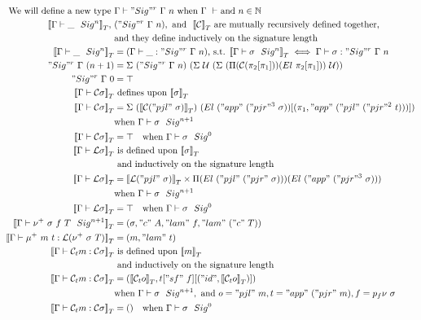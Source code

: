 \begin{align*}
  \text{We will define a new type }& \goodType{\Gamma}{\Sigr{\Gamma}{n}}{} \text{ when } \goodCtx{\Gamma}{} \text{ and } n \in \mathbb{N} \\
  \denotesT{\goodSig{\Gamma}{\_}{n}},\ &({\Sigr{\Gamma}{n}}), \text{ and } \ \denotesT{\cC} \text{ are mutually recursively defined together, } \\
  & \text{and they define inductively on the signature length} \\  
  \denotesT{\goodSig{\Gamma}{\_}{n}} &= (\goodTerm{\Gamma}{\_}{\Sigr{\Gamma}{n}}) \text{, s.t. } \denotesT{\goodSig{\Gamma}{\sigma}{n}} \iff \goodTerm{\Gamma}{\sigma}{\Sigr{\Gamma}{n}} \\ 
  {\Sigr{\Gamma}{(n+1)}} &= 
    \Sigma~(\Sigr{\Gamma}{n})
          ~(\Sigma~\cU
                  ~(\Sigma~(\Pi(\cC (\pi_2[\pi_1]))(El~\pi_2[\pi_1]))~\cU)) \\
  \Sigr{\Gamma}{0} &= \top \\
  \denotesT{\goodType{\Gamma}{\cC \sigma}{}} &\text{ defines upon } \denotesT{\sigma} \\
  \denotesT{\goodType{\Gamma}{\cC \sigma}{}} &= 
    \Sigma~(\denotesT{\cC ("pjl"~\sigma)})~(El \ ("app"~("pjr"^3~\sigma))[(\pi_1, "app"~("pjl"~("pjr"^2~t)))]) \\
      &\text{when } \goodSig{\Gamma}{\sigma}{n+1} \\
  \denotesT{\goodType{\Gamma}{\cC \sigma}{}} &= \top \quad
      \text{when } \goodSig{\Gamma}{\sigma}{0} \\ 
  \denotesT{\goodType{\Gamma}{\cL\sigma}{}} & \text{ is defined upon } \denotesT{\sigma} \\
  & \text{ and inductively on the signature length} \\ 
  \denotesT{\goodType{\Gamma}{\cL\sigma}{}} &=
  \denotesT{\cL("pjl"~\sigma)} \times \Pi(El~("pjl"~("pjr"~\sigma)))(El~("app"~("pjr"^3~\sigma))) \\
  &\text{when } \goodSig{\Gamma}{\sigma}{n+1} \\
  \denotesT{\goodType{\Gamma}{\cL\sigma}{}} &= \top \quad \text{when } \goodSig{\Gamma}{\sigma}{0} \\
  \denotesT{\goodSig{\Gamma}{\nu^+~\sigma~f~T}{n+1}} &= (\sigma, "c"~A, "lam"~f, "lam"~("c"~T)) \\ 
  \denotesT{\goodTerm{\Gamma}{\mu^+~m~t}{\cL(\nu^+~\sigma~T)}} &= (m, "lam"~t) \\ 
  \denotesT{\goodTerm{\Gamma}{\cCt m}{\cC\sigma}} & \text{ is defined upon } \denotesT{m}\\
  & \text{ and inductively on the signature length} \\ 
  \denotesT{\goodTerm{\Gamma}{\cCt m}{\cC\sigma}} &= 
  (\denotesT{\cCt o}, t["sf"~f][("id", \denotesT{\cCt o})]) \\
  & \text{when } \goodSig{\Gamma}{\sigma}{n+1}, \text{ and } o = "pjl"~m, t = "app"~("pjr"~m), f = p_f\nu~\sigma \\ 
  \denotesT{\goodTerm{\Gamma}{\cCt m}{\cC \sigma}} &= () \quad \text{when } \goodSig{\Gamma}{\sigma}{0}
\end{align*}



